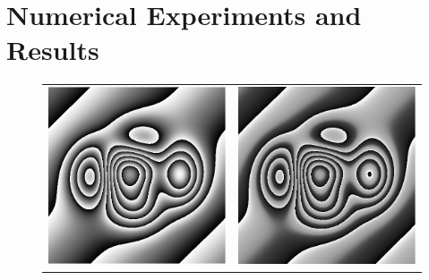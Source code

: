 \documentclass[letterpaper,12pt]{article}   %
\begin{document}
  \section{Numerical Experiments and Results}
  \begin{figure}[ t]
    \begin{center}
      \begin{tabular}{c c}
        \includegraphics[scale=0.35]{figures/faseRST.png}}&
      \includegraphics[scale=0.35]{figures/faseAIA.png}}& \\

\end{tabular}
\end{center}
\end{figure}
\end{document}
